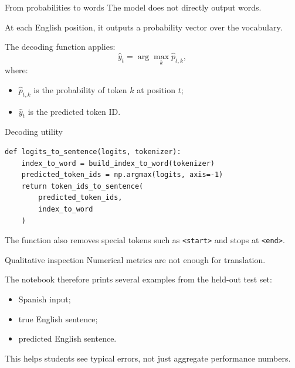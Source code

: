 \documentclass[aspectratio=169]{beamer}
\begin{document}
%
%
\begin{frame}[fragile]{From probabilities to words}
The model does not directly output words.

\vspace{0.3cm}
At each English position, it outputs a probability vector over the vocabulary.

\vspace{0.3cm}
The decoding function applies:
\[
    \hat{y}_t = \arg\max_k \hat{p}_{t,k},
\]
where:
\begin{itemize}
    \item $\hat{p}_{t,k}$ is the probability of token $k$ at position $t$;
    \item $\hat{y}_t$ is the predicted token ID.
\end{itemize}
\end{frame}
%
%
\begin{frame}[fragile]{Decoding utility}
\begin{lstlisting}
def logits_to_sentence(logits, tokenizer):
    index_to_word = build_index_to_word(tokenizer)
    predicted_token_ids = np.argmax(logits, axis=-1)
    return token_ids_to_sentence(
        predicted_token_ids,
        index_to_word
    )
\end{lstlisting}

\vspace{0.2cm}
The function also removes special tokens such as \texttt{<start>} and stops at \texttt{<end>}.
\end{frame}
%
%
\begin{frame}[fragile]{Qualitative inspection}
Numerical metrics are not enough for translation.

\vspace{0.3cm}
The notebook therefore prints several examples from the held-out test set:
\begin{itemize}
    \item Spanish input;
    \item true English sentence;
    \item predicted English sentence.
\end{itemize}

\vspace{0.3cm}
This helps students see typical errors, not just aggregate performance numbers.
\end{frame}
\end{document}
